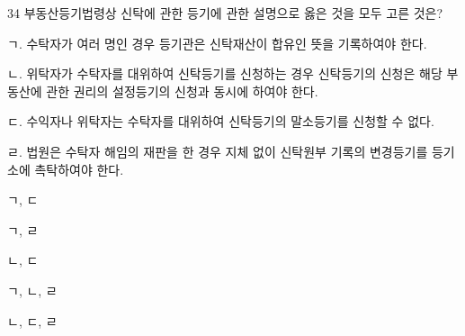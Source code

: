 \begin{question}{34}
부동산등기법령상 신탁에 관한 등기에 관한 설명으로 옳은 것을 모두 고른 것은?
\begin{framedtext}
ㄱ. 수탁자가 여러 명인 경우 등기관은 신탁재산이 합유인 뜻을 기록하여야 한다. \par
ㄴ. 위탁자가 수탁자를 대위하여 신탁등기를 신청하는 경우 신탁등기의 신청은 해당 부동산에 관한 권리의 설정등기의 신청과 동시에 하여야 한다. \par
ㄷ. 수익자나 위탁자는 수탁자를 대위하여 신탁등기의 말소등기를 신청할 수 없다. \par
ㄹ. 법원은 수탁자 해임의 재판을 한 경우 지체 없이 신탁원부 기록의 변경등기를 등기소에 촉탁하여야 한다. \par
\end{framedtext}
\begin{choices}
  \item ㄱ, ㄷ
  \item ㄱ, ㄹ
  \item ㄴ, ㄷ
  \item ㄱ, ㄴ, ㄹ
  \item ㄴ, ㄷ, ㄹ
\end{choices}
\end{question}
